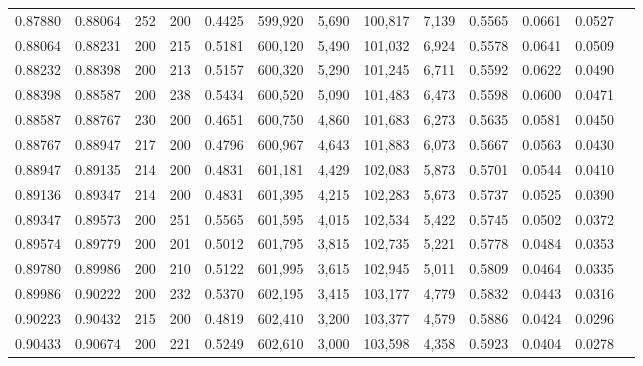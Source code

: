 \begin{tabular}{rrrrrrrrrrrrr}
0.87880 & 0.88064 &    252 & 200 &                                     0.4425 & 599,920 &   5,690 & 100,817 &   7,139 & 0.5565 & 0.0661 & 0.0527 \\
0.88064 & 0.88231 &    200 & 215 &                                     0.5181 & 600,120 &   5,490 & 101,032 &   6,924 & 0.5578 & 0.0641 & 0.0509 \\
0.88232 & 0.88398 &    200 & 213 &                                     0.5157 & 600,320 &   5,290 & 101,245 &   6,711 & 0.5592 & 0.0622 & 0.0490 \\
0.88398 & 0.88587 &    200 & 238 &                                     0.5434 & 600,520 &   5,090 & 101,483 &   6,473 & 0.5598 & 0.0600 & 0.0471 \\
0.88587 & 0.88767 &    230 & 200 &                                     0.4651 & 600,750 &   4,860 & 101,683 &   6,273 & 0.5635 & 0.0581 & 0.0450 \\
0.88767 & 0.88947 &    217 & 200 &                                     0.4796 & 600,967 &   4,643 & 101,883 &   6,073 & 0.5667 & 0.0563 & 0.0430 \\
0.88947 & 0.89135 &    214 & 200 &                                     0.4831 & 601,181 &   4,429 & 102,083 &   5,873 & 0.5701 & 0.0544 & 0.0410 \\
0.89136 & 0.89347 &    214 & 200 &                                     0.4831 & 601,395 &   4,215 & 102,283 &   5,673 & 0.5737 & 0.0525 & 0.0390 \\
0.89347 & 0.89573 &    200 & 251 &                                     0.5565 & 601,595 &   4,015 & 102,534 &   5,422 & 0.5745 & 0.0502 & 0.0372 \\
0.89574 & 0.89779 &    200 & 201 &                                     0.5012 & 601,795 &   3,815 & 102,735 &   5,221 & 0.5778 & 0.0484 & 0.0353 \\
0.89780 & 0.89986 &    200 & 210 &                                     0.5122 & 601,995 &   3,615 & 102,945 &   5,011 & 0.5809 & 0.0464 & 0.0335 \\
0.89986 & 0.90222 &    200 & 232 &                                     0.5370 & 602,195 &   3,415 & 103,177 &   4,779 & 0.5832 & 0.0443 & 0.0316 \\
0.90223 & 0.90432 &    215 & 200 &                                     0.4819 & 602,410 &   3,200 & 103,377 &   4,579 & 0.5886 & 0.0424 & 0.0296 \\
0.90433 & 0.90674 &    200 & 221 &                                     0.5249 & 602,610 &   3,000 & 103,598 &   4,358 & 0.5923 & 0.0404 & 0.0278 \\

\end{tabular}
